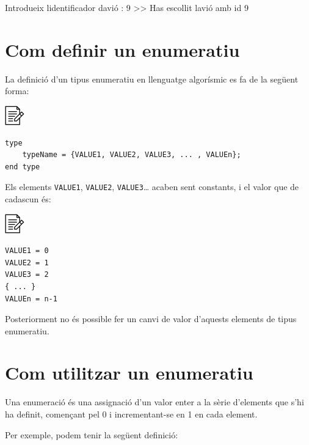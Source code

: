 \documentclass[
]{book}
\newenvironment{Shaded}{\begin{snugshade}}{\end{snugshade}}
\newcommand{\DecValTok}[1]{\textcolor[rgb]{0.00,0.00,0.81}{#1}}
\newcommand{\NormalTok}[1]{#1}
\begin{document}
\begin{Shaded}
\begin{Highlighting}[]
\NormalTok{Introdueix l\textquotesingle{}identificador d\textquotesingle{}avió : }\DecValTok{9}
\NormalTok{\textgreater{}\textgreater{} Has escollit l\textquotesingle{}avió amb id }\DecValTok{9} 
\end{Highlighting}
\end{Shaded}

\hypertarget{com-definir-un-enumeratiu}{%
\section{Com definir un enumeratiu}\label{com-definir-un-enumeratiu}}

La definició d'un tipus enumeratiu en llenguatge algorísmic es fa de la següent forma:

\includegraphics{./img/alg.png}

\begin{verbatim}
type
    typeName = {VALUE1, VALUE2, VALUE3, ... , VALUEn};
end type
\end{verbatim}

Els elements \texttt{VALUE1}, \texttt{VALUE2}, \texttt{VALUE3}\ldots{} acaben sent constants, i el valor que de cadascun és:

\includegraphics{./img/alg.png}

\begin{verbatim}
VALUE1 = 0
VALUE2 = 1
VALUE3 = 2 
{ ... }
VALUEn = n-1
\end{verbatim}

Posteriorment no és possible fer un canvi de valor d'aquests elements de tipus enumeratiu.

\hypertarget{com-utilitzar-un-enumeratiu}{%
\section{Com utilitzar un enumeratiu}\label{com-utilitzar-un-enumeratiu}}

Una enumeració és una assignació d'un valor enter a la sèrie d'elements que s'hi ha definit, començant pel 0 i incrementant-se en 1 en cada element.

Per exemple, podem tenir la següent definició:
\end{document}
